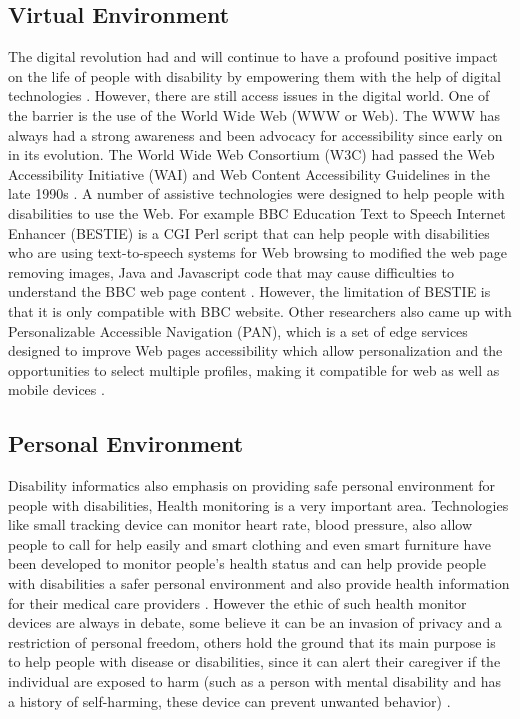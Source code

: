\documentclass[sigconf]{acmart}
\begin{document}
\subsection{Virtual Environment}
The digital revolution had and will continue to have a profound positive impact on the life of people with
disability by empowering them with the help of digital technologies \cite{Appleyard2005}. However, there are
still access issues in the digital world. One of the barrier is the use of the World Wide Web (WWW or Web).
The WWW has always had a strong awareness and been advocacy for accessibility since early on in its
evolution. The World Wide Web Consortium (W3C) had passed the Web Accessibility Initiative (WAI) and Web
Content Accessibility Guidelines in the late 1990s \cite{Appleyard2005}. A number of assistive technologies
were designed to help people with disabilities to use the Web. For example BBC Education Text to Speech
Internet Enhancer (BESTIE) is a CGI Perl script that can help people with disabilities who are using
text-to-speech systems for Web browsing to modified the web page removing images, Java and Javascript code
that may cause difficulties to understand the BBC web page content \cite{Erra}. 
However, the limitation of BESTIE is that it is only compatible with BBC website. Other researchers also
came up with Personalizable Accessible Navigation (PAN), which is a set of edge services designed to improve
Web pages accessibility which allow  personalization and the opportunities to select multiple profiles,
making it compatible for web as well as mobile devices \cite{info:doi/10.2196/mhealth.3956}.

\subsection{Personal Environment}
 Disability informatics also emphasis on providing safe personal environment for people with disabilities,
 Health monitoring is a very important area. Technologies like small tracking device can monitor heart rate,
 blood pressure, also allow people to call for help easily and smart clothing and even smart furniture have
 been developed to monitor people's health status and can help provide people with disabilities a safer
 personal environment and also provide health information for their medical care providers
 \cite{Appleyard2005}. However the ethic of such health monitor devices are always in debate, some believe
 it can be an invasion of privacy and a restriction of personal freedom, others hold the ground that its
 main purpose is to help people with disease or disabilities, since it can alert their caregiver if the
 individual are exposed to harm (such as a person with mental disability and has a history of self-harming,
 these device can prevent unwanted behavior) \cite{cunningham2017cloud}. 
 
\end{document}
